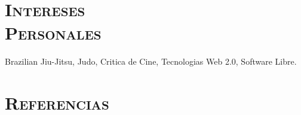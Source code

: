 \begin{resume}

\section{\textsc{Intereses\\ Personales}}
\employer{}
\title{}
\location{} 
\dates{}
Brazilian Jiu-Jitsu, Judo, Critica de Cine, Tecnologias Web 2.0, Software Libre.
\newline     
\newline


\section{\textsc{Referencias}}


\end{resume}
